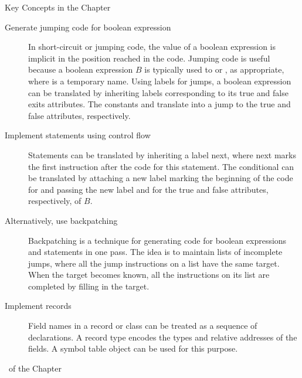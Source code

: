 \begin{bibunit}[apalike]
\begin{frame}[t,allowframebreaks]{Key Concepts in the Chapter}
\begin{description}
	\item[Generate jumping code for boolean expression] In short-circuit or jumping code, the value of a boolean expression is implicit in the position reached in the code. Jumping code is useful because a boolean expression $B$ is typically used to  or , as appropriate, where  is a temporary name. Using labels for jumps, a boolean expression can be translated by inheriting labels corresponding to its true and false exits attributes. The constants  and  translate into a jump to the true and false attributes, respectively.
	\item[Implement statements using control flow] Statements can be translated by inheriting a label next, where next marks the first instruction after the code for this statement. The conditional  can be translated by attaching a new label marking the beginning of the code for  and passing the new label and  for the true and false attributes, respectively, of $B$.
	\item[Alternatively, use backpatching] Backpatching is a technique for generating code for boolean expressions and statements in one pass. The idea is to maintain lists of incomplete jumps, where all the jump instructions on a list have the same target. When the target becomes known, all the instructions on its list are completed by filling in the target.
	\item[Implement records] Field names in a record or class can be treated as a sequence of declarations. A record type encodes the types and relative addresses of the fields. A symbol table object can be used for this purpose.
	\end{description}
\end{frame}

\begin{frame}[t,allowframebreaks]{\bibname\ of the Chapter}%
	\tiny%
\end{frame}%

\end{bibunit}


